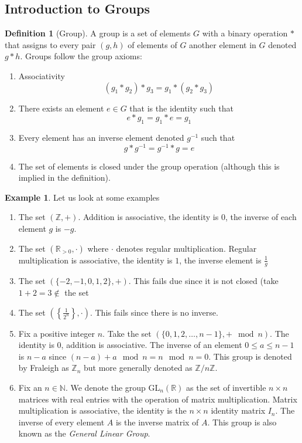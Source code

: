 \documentclass{article}
\newcommand{\R}{\mathbb{R}}
\newcommand{\Z}{\mathbb{Z}}
\newcommand{\N}{\mathbb{N}}
\theoremstyle{definition}
\newtheorem{definition}[theorem]{Definition}
\newtheorem{example}[theorem]{Example}
\begin{document}
\subsection{Introduction to Groups}
\begin{definition}[Group]
    A group is a set of elements $G$ with a binary operation $*$ that assigns to every pair $(g,h)$ of elements of $G$ another element in $G$ denoted $g*h$. Groups follow the group axioms:
    \begin{enumerate}
        \item Associativity
        \begin{equation*}
            (g_1*g_2)*g_3 = g_1*(g_2*g_3)
        \end{equation*}
        \item There exists an element $e\in G$ that is the identity such that 
        \begin{equation*}
            e*g_1=g_1*e=g_1
        \end{equation*}
        \item Every element has an inverse element denoted $g^{-1}$ such that 
        \begin{equation*}
            g*g^{-1} = g^{-1}*g = e
        \end{equation*}
        \item The set of elements is closed under the group operation (although this is implied in the definition).
    \end{enumerate}
\end{definition}
\begin{example}
    Let us look at some examples
    \begin{enumerate}
        \item The set $(\Z,+)$. Addition is associative, the identity is 0, the inverse of each element $g$ is $-g$. 
        \item The set $(\R_{>0}, \cdot)$ where $\cdot$ denotes regular multiplication. Regular multiplication is associative, the identity is $1$, the inverse element is $\frac{1}{g}$
        \item The set $(\{-2,-1,0,1,2\},+)$. This fails due since it is not closed (take $1+2=3 \notin $ the set
        \item The set $\left(\left\{ \frac{1}{2^n} \right\}, \cdot \right)$. This fails since there is no inverse.
        \item Fix a positive integer $n$. Take the set $\left( \{0,1,2,\ldots,n-1\}, +\mod n\right)$. The identity is 0, addition is associative. The inverse of an element $0\leq a\leq n-1$ is $n-a$ since $(n-a)+a \mod n = n\mod n = 0$. This group is denoted by Fraleigh as $\Z_n$ but more generally denoted as $\Z/n\Z$.
        \item Fix an $n\in \N$. We denote the group GL$_n(\R)$ as the set of invertible $n\times n$ matrices with real entries with the operation of matrix multiplication. Matrix multiplication is associative, the identity is the $n\times n$ identity matrix $I_n$. The inverse of every element $A$ is the inverse matrix of $A$. This group is also known as the \textit{General Linear Group}.
    \end{enumerate}
\end{example}
\end{document}
